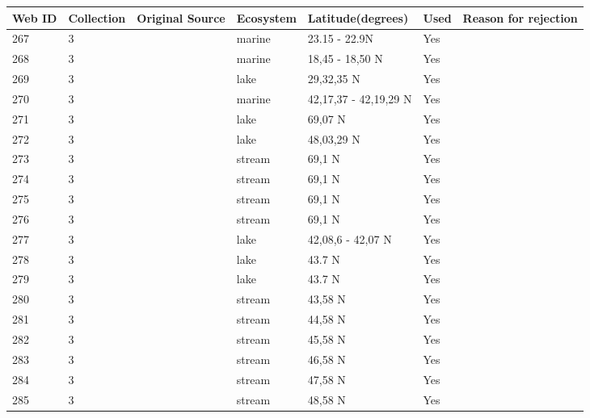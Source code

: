 \documentclass[12pt]{article}
\begin{document}
\begin{landscape}
    \begin{table}[h!]
    \centering
    {\footnotesize
      \begin{tabular}{p{2.8cm}p{1.3cm}p{3cm}p{2.2cm}p{2.5cm}lp{8.2cm}}
        \hline
        Web ID & Collection & Original Source & Ecosystem & Latitude(degrees) & Used  & Reason for rejection  \\
        \hline
        267   & 3 & \cite{Zetina-Rejon2003}  & marine & 23.15 - 22.9N & Yes   &       \\
        268   & 3 & \cite{Cruz-Escalona2007}  & marine & 18,45 - 18,50 N & Yes   &       \\
        269   & 3 & \cite{Liu2007}  & lake  & 29,32,35 N & Yes   &       \\
        270   & 3 & \cite{Filgueira2011}  & marine & 42,17,37 - 42,19,29 N & Yes   &       \\
        271   & 3 & \cite{Amundsen2013}  & lake  & 69,07 N & Yes   &        \\
        272   & 3 & \cite{Hampton2011}    & lake  & 48,03,29 N & Yes   &       \\
        273   & 3 & \cite{Parker2006}  & stream & 69,1 N & Yes   &       \\
        274   & 3 & \cite{Parker2006}  & stream & 69,1 N & Yes   &       \\
        275   & 3 & \cite{Parker2006}  & stream & 69,1 N & Yes   &       \\
        276   & 3 & \cite{Parker2006}  & stream & 69,1 N & Yes   &       \\
        277   & 3 & \cite{Massana1996}  & lake  & 42,08,6 - 42,07 N & Yes   &       \\
        278   & 3 & \cite{Stewart2011}    & lake  & 43.7 N & Yes   &       \\
        279   & 3 & \cite{Stewart2011}    & lake  & 43.7 N & Yes   &       \\
        280   & 3 & \cite{Cromar1996}  & stream & 43,58 N & Yes   &       \\
        281   & 3 & \cite{Cromar1996}  & stream & 44,58 N & Yes   &       \\
        282   & 3 & \cite{Cromar1996}  & stream & 45,58 N & Yes   &       \\
        283   & 3 & \cite{Cromar1996}  & stream & 46,58 N & Yes   &       \\
        284   & 3 & \cite{Cromar1996}  & stream & 47,58 N & Yes   &       \\
        285   & 3 & \cite{Cromar1996}  & stream & 48,58 N & Yes   &       \\

\end{tabular}}
\end{table}
\end{landscape}
\end{document}
